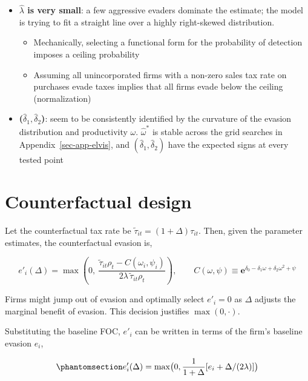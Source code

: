 \documentclass[
  12pt,
  letterpaper,
  oneside,
  openany]{report}
\providecommand{\tightlist}{%
  \setlength{\itemsep}{0pt}\setlength{\parskip}{0pt}}
\begin{document}
\begin{itemize}
\tightlist
\item
  \textbf{\(\hat\lambda\) is very small}: a few aggressive evaders
  dominate the estimate; the model is trying to fit a straight line over
  a highly right-skewed distribution.

  \begin{itemize}
  \tightlist
  \item
    Mechanically, selecting a functional form for the probability of
    detection imposes a ceiling probability
  \item
    Assuming all unincorporated firms with a non-zero sales tax rate on
    purchases evade taxes implies that all firms evade below the ceiling
    (normalization)
  \end{itemize}
\item
  \textbf{(\(\hat\delta_1, \hat\delta_2\))}: seem to be consistently
  identified by the curvature of the evasion distribution and
  productivity \(\omega\). \(\hat\omega^*\) is stable across the grid
  searches in Appendix~\ref{sec-app-elvis}, and
  \((\hat\delta_1,\hat\delta_2)\) have the expected signs at every
  tested point
\end{itemize}

\section{Counterfactual design}\label{sec-cf-design}

Let the counterfactual tax rate be
\(\tilde\tau_{it}=(1+\Delta)\tau_{it}\). Then, given the parameter
estimates, the counterfactual evasion is,

\[
e'_i(\Delta)=\max\left(0,\ \frac{\tilde\tau_{it}\rho_t-C(\omega_i,\psi_i)}{2\lambda\,\tilde\tau_{it}\rho_t}\right),\qquad C(\omega,\psi)\equiv\textbf{e}^{\delta_0-\delta_1\omega+\delta_2\omega^2+\psi}
\]

Firms might jump out of evasion and optimally select \(e'_i=0\) as
\(\Delta\) adjusts the marginal benefit of evasion. This decision
justifies \(\max(0,\cdot)\).

Substituting the baseline FOC, \(e'_i\) can be written in terms of the
firm's baseline evasion \(e_i\),

\begin{equation}\protect\phantomsection\label{eq-counter-e}{
e'_i(\Delta)=\max\!\big(0,\frac{1}{1+\Delta}[e_i+\Delta/(2\lambda)]\big)
}\end{equation}
\end{document}
